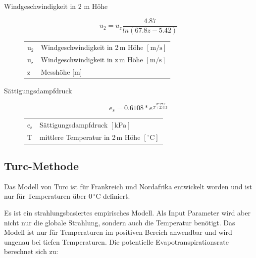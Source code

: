 \begin{description}
\item[Windgeschwindigkeit in 2 m Höhe]
\begin{equation}
\label{eq:u2}
u_2=u_z\frac{4.87}{ln(67.8z-5.42)}
\end{equation}
\begin{table}[H]
\centering
\begin{tabular}{ll}
$\mathrm{u_2}$ & Windgeschwindigkeit in 2\,m Höhe $\mathrm{[m/s]}$\\
$\mathrm{u_z}$ & Windgeschwindigkeit in z\,m Höhe $\mathrm{[m/s]}$\\
z & Messhöhe [m]\\
\end{tabular}
\end{table}

\item[Sättigungsdampfdruck]
\begin{equation}
\label{eq:es}
e_s=0.6108*e^{\frac{17.27T}{T+273.3}}
\end{equation}
\begin{table}[H]
\centering
\begin{tabular}{ll}
$\mathrm{e_s}$ & Sättigungsdampfdruck $\mathrm{[kPa]}$\\
T & mittlere Temperatur in 2\,m Höhe $\mathrm{[^{\circ}C]}$\\\end{tabular}
\end{table}

\end{description}

\subsection{Turc-Methode}
Das Modell von Turc ist für Frankreich und Nordafrika entwickelt worden und ist nur für Temperaturen über 0\,$\mathrm{^{\circ}C}$ definiert.

Es ist ein strahlungsbasiertes empirisches Modell. Als Input Parameter wird aber nicht nur die globale Strahlung, sondern auch die Temperatur benötigt. Das Modell ist nur für Temperaturen im positiven Bereich anwendbar und wird ungenau bei tiefen Temperaturen. Die potentielle Evapotranspirationsrate berechnet sich zu:

